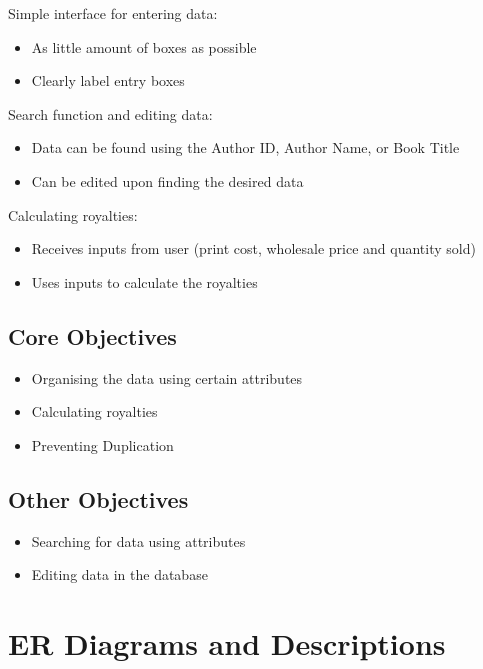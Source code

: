 Simple interface for entering data:

\begin{itemize}
    \item As little amount of boxes as possible
    \item Clearly label entry boxes
\end{itemize}


Search function and editing data:

\begin{itemize}
    \item Data can be found using the Author ID, Author Name, or Book Title
    \item Can be edited upon finding the desired data
\end{itemize}


Calculating royalties:

\begin{itemize}
    \item Receives inputs from user (print cost, wholesale price and quantity sold)
    \item Uses inputs to calculate the royalties
\end{itemize}

\subsection{Core Objectives}

\begin{itemize}
    \item Organising the data using certain attributes
    \item Calculating royalties
    \item Preventing Duplication
\end{itemize}

\subsection{Other Objectives}

\begin{itemize}
    \item Searching for data using attributes
    \item Editing data in the database
\end{itemize}

\section{ER Diagrams and Descriptions}

